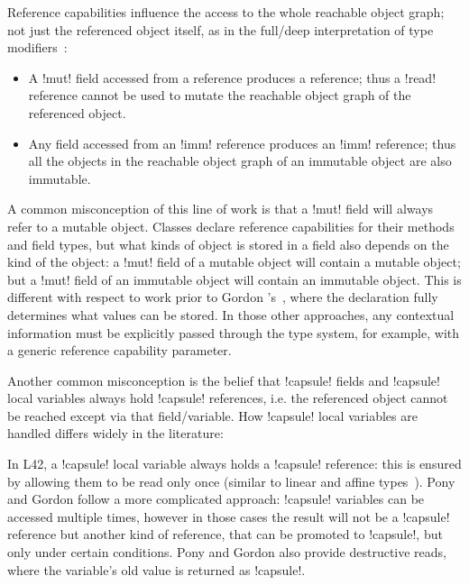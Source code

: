 Reference capabilities influence the access to the whole reachable object graph; not just the referenced object itself, as in the full/deep interpretation of type modifiers~\cite{ZibinEtAl10,Potanin2013}:
\begin{itemize}

  \item 
A \Q!mut! field accessed from a \Q@read@ reference produces a \Q@read@ reference; thus a \Q!read! reference cannot be used to mutate the reachable object graph of the referenced object.

  \item 
Any field accessed from an \Q!imm! reference produces an \Q!imm! reference; thus all the objects in the reachable object graph of an immutable object are also immutable.
\end{itemize}
A common misconception of this line of work is that a \Q!mut! field will always refer to a mutable object.
Classes declare reference capabilities for their methods and field types, but  what kinds of object is stored in a field also depends on the kind of the object: a \Q!mut! field of a mutable object will contain a mutable object; but a \Q!mut! field of an immutable object will contain an immutable object.
This is different with respect to work prior to Gordon \etal's~\cite{GordonEtAl12}, where the
declaration fully determines what values can be stored. In those other approaches, any contextual information must be explicitly passed through the type system, for example, with a generic reference capability parameter.


Another common misconception is the belief that \Q!capsule! fields and \Q!capsule! local variables always hold \Q!capsule! references, i.e. the referenced object cannot be reached except via that field/variable.
How \Q!capsule! local variables are handled differs widely in the literature:

In L42, a \Q!capsule! local variable always holds a \Q!capsule! reference: this is ensured by allowing them to be read only once (similar to linear and affine types~\cite{boyland2001alias}). 
Pony and Gordon \etal follow a more complicated approach: \Q!capsule! variables can be accessed multiple times, however in those cases the result will not be a \Q!capsule! reference but another kind of reference, that can be promoted to \Q!capsule!, but only under certain conditions. Pony and Gordon also provide destructive reads, where the variable's old value is returned as \Q!capsule!.

